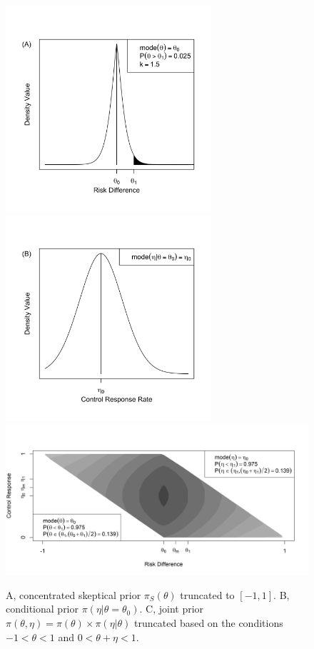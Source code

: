 \documentclass[useAMS,usenatbib,referee]{biom}
\begin{document}
\begin{figure}\begin{center}
\includegraphics[width=3in]{figure5a_NEW.png}
\includegraphics[width=3in]{figure5b_NEW.png}
\includegraphics[width=6in]{figure5a.png}
\caption{A, concentrated skeptical prior $\pi_S(\theta)$ truncated to $[-1,1]$. B, conditional prior $\pi(\eta|\theta=\theta_0)$. C, joint prior $\pi(\theta,\eta)=\pi(\theta)\times\pi(\eta|\theta)$ truncated based on the conditions $-1<\theta<1$ and $0<\theta+\eta<1$.}
\label{fig:figure5}
 \end{center}
\end{figure}
\end{document}
